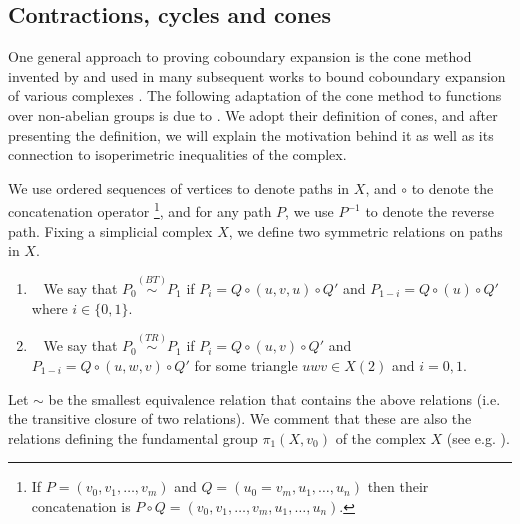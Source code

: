 \documentclass[10pt,a4paper]{article}
\theoremstyle{definition}
\theoremstyle{remark}
\newcommand{\Authornotecolored}[3]{{\sffamily\small\color{#1}{[#2: #3]}}}
\newcommand{\Authornotecolored}[3]{}
\newcommand{\Ynote}{\Authornotecolored{Purple}{Y}}
\newcommand{\Snote}{\Authornotecolored{Green}{S}}
\newcommand{\snote}{\Snote}
\numberwithin{equation}{section}
\begin{document}
\subsection{Contractions, cycles and cones} \label{sec:cones}
One general approach to proving coboundary expansion is the cone method invented by \cite{Gromov2010} and used in many subsequent works to bound coboundary expansion of various complexes \cite{LubotzkyMM2016,KaufmanM2018,KozlovM2019,KaufmanO2021,DiksteinD2023cbdry}. The following adaptation of the cone method to functions over non-abelian groups is due to \cite{DiksteinD2023swap}. \Ynote{Just to note: I am ok with doing things in this order but Avi will possibly want to first give the intuition and then explain? So maybe we can at least ref to what we said about this in the intro?} \snote{We provide intuition after the definition. It would be hard to explain them without defining cones and recall def of coboundary expander. I am for keeping it as is.} We adopt their definition of cones, and after presenting the definition, we will explain the motivation behind it as well as its connection to isoperimetric inequalities of the complex.

We use ordered sequences of vertices to denote paths in $X$, and $\circ$ to denote the concatenation operator \footnote{If $P= (v_0,v_1,\dots,v_m)$ and $Q = (u_0 = v_m,u_1,\dots,u_n)$ then their concatenation is $P\circ Q = (v_0,v_1,\dots,v_m,u_1,\dots,u_n)$.}, and for any path \(P \), we use $P^{-1}$ to denote the reverse path. 
Fixing a simplicial complex \(X\), we define two symmetric relations on paths in \(X\).
\begin{enumerate}
    \item[(BT)]~ We say that \(P_0 \overset{(BT)}{\sim} P_1\) if \(P_i = Q \circ (u,v,u) \circ Q'\) and \(P_{1-i} = Q \circ (u) \circ Q'\) where \(i\in\{0,1\}\).
    \item[(TR)]~ We say that \(P_0 \overset{(TR)}{\sim} P_1\) if \(P_{i} = Q \circ (u,v) \circ Q'\) and \(P_{1-i} = Q \circ (u,w,v) \circ Q'\) for some triangle \(uwv \in X(2)\) and \(i=0,1\).
\end{enumerate}

Let \(\sim\) be the smallest equivalence relation that contains the above relations (i.e. the transitive closure of two relations). We comment that these are also the relations defining the fundamental group \(\pi_1(X,v_0)\) of the complex $X$ (see e.g. \cite{Surowski1984}).
\end{document}
